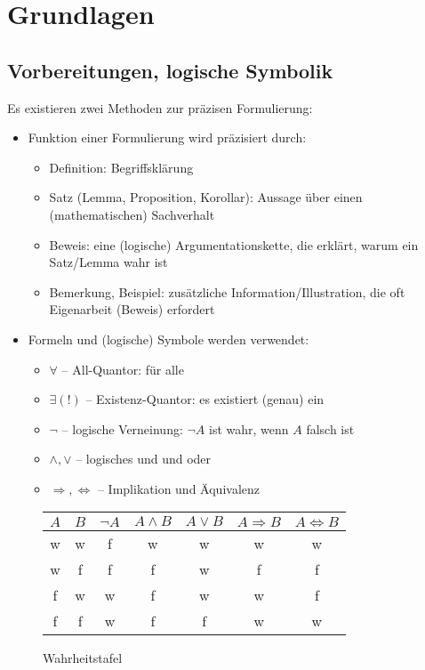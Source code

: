 \chapter{Grundlagen}

\section{Vorbereitungen, logische Symbolik}
	Es existieren zwei Methoden zur präzisen Formulierung:
	\begin{itemize}
	\item Funktion einer Formulierung wird präzisiert durch:
		\begin{itemize}
			\item Definition: Begriffsklärung
			\item Satz (Lemma, Proposition, Korollar): Aussage über einen (mathematischen) Sachverhalt
			\item Beweis: eine (logische) Argumentationskette, die erklärt, warum ein Satz/Lemma wahr ist
			\item Bemerkung, Beispiel: zusätzliche Information/Illustration, die oft Eigenarbeit (Beweis) erfordert
		\end{itemize}
	\item Formeln und (logische) Symbole werden verwendet:
		\begin{itemize}
			\item $\forall$ -- All-Quantor: \glqq für alle\grqq
			\item $\exists(!)$ -- Existenz-Quantor: \glqq es existiert (genau) ein\grqq
			\item $\lnot$ -- logische Verneinung: $\lnot A$ ist wahr, wenn $A$ falsch ist
			\item $\land ,\lor$ -- logisches \glqq und\grqq{} und \glqq oder\grqq
			\item $\Rightarrow ,\Leftrightarrow$ -- Implikation und Äquivalenz
		\end{itemize}
	\end{itemize}

	\begin{figure}[H]\centering
		\begin{tabular}{c|c|c|c|c|c|c}
			$A$ & $B$ & $\lnot A$ & $A\land B$ &$A\lor B$&$A \Rightarrow B$ & $A\Leftrightarrow B$\\\hline
			w & w & f & w & w & w & w\\
			w & f & f & f & w & f & f\\
			f & w & w & f & w & w & f\\
			f & f & w & f & f & w & w\\
		\end{tabular}
	\caption{Wahrheitstafel}
	\end{figure}


